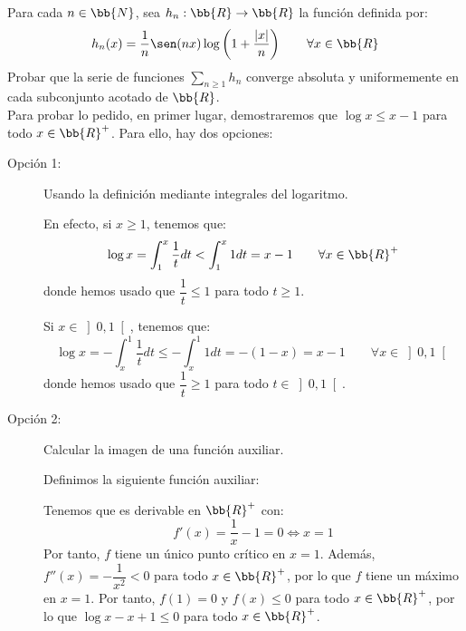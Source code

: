 \begin{ejercicio}
    Para cada $n\in \bb{N}$, sea $h_n:\bb{R}\to \bb{R}$ la función definida por:
    \begin{equation*}
        h_n(x) = \frac{1}{n}\sen(nx)\log\left(1+\frac{|x|}{n}\right) \qquad \forall x\in \bb{R}
    \end{equation*}
    Probar que la serie de funciones $\sum\limits_{n\geq 1}h_n$ converge absoluta y uniformemente en cada
    subconjunto acotado de $\bb{R}$.\\

    Para probar lo pedido, en primer lugar, demostraremos que $\log x \leq x-1$ para todo $x\in \bb{R}^+$. Para ello, hay dos opciones:
    \begin{description}
        \item[Opción 1:] Usando la definición mediante integrales del logaritmo.
        
        En efecto, si $x\geq 1$, tenemos que:
        \begin{equation*}
            \log x = \int_1^x \frac{1}{t}dt < \int_1^x 1dt = x-1 \qquad \forall x\in \bb{R}^+
        \end{equation*}
        donde hemos usado que $\dfrac{1}{t}\leq 1$ para todo $t\geq 1$.

        Si $x\in \left]0,1\right[$, tenemos que:
        \begin{equation*}
            \log x = -\int_x^1 \frac{1}{t}dt \leq -\int_x^1 1dt = -(1-x)=x-1 \qquad \forall x\in \left]0,1\right[
        \end{equation*}
        donde hemos usado que $\dfrac{1}{t}\geq 1$ para todo $t\in \left]0,1\right[$.

        \item[Opción 2:] Calcular la imagen de una función auxiliar.
        
        Definimos la siguiente función auxiliar:
        
        Tenemos que es derivable en $\bb{R}^+$ con:
        \begin{equation*}
            f'(x) = \frac{1}{x} - 1 = 0 \Longleftrightarrow x=1
        \end{equation*}
        Por tanto, $f$ tiene un único punto crítico en $x=1$. Además, $f''(x) = -\dfrac{1}{x^2} < 0$ para todo $x\in \bb{R}^+$, por lo que $f$ tiene un máximo en $x=1$.
        Por tanto, $f(1)=0$ y $f(x)\leq 0$ para todo $x\in \bb{R}^+$, por lo que $\log x -x+1\leq 0$ para todo $x\in \bb{R}^+$.
    \end{description}


\end{ejercicio}
